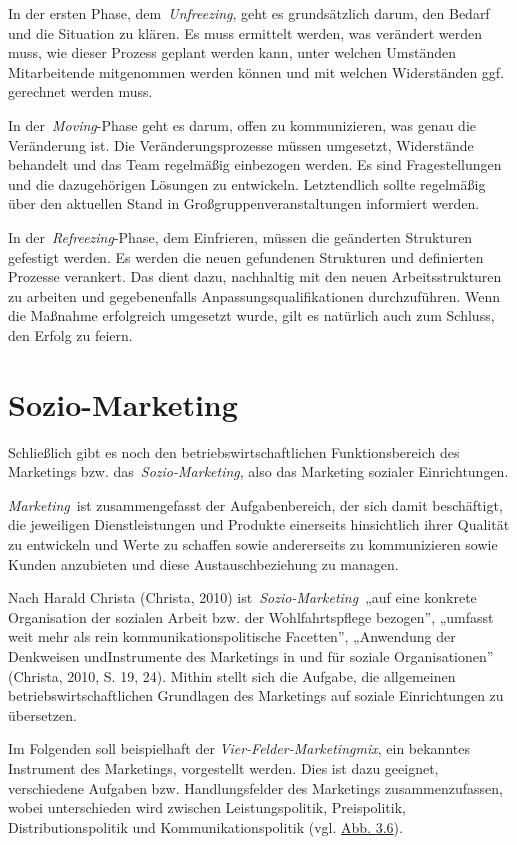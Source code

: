 \documentclass[
  letterpaper,
]{book}
\begin{document}
In der ersten Phase, dem~\emph{Unfreezing}, geht es grundsätzlich darum,
den Bedarf und die Situation zu klären. Es muss ermittelt werden, was
verändert werden muss, wie dieser Prozess geplant werden kann, unter
welchen Umständen Mitarbeitende mitgenommen werden können und mit
welchen Widerständen ggf. gerechnet werden muss.

In der~\emph{Moving}-Phase geht es darum, offen zu kommunizieren, was
genau die Veränderung ist. Die Veränderungsprozesse müssen umgesetzt,
Widerstände behandelt und das Team regelmäßig einbezogen werden. Es sind
Fragestellungen und die dazugehörigen Lösungen zu entwickeln.
Letztendlich sollte regelmäßig über den aktuellen Stand in
Großgruppenveranstaltungen informiert werden.

In der~\emph{Refreezing}-Phase, dem Einfrieren, müssen die geänderten
Strukturen gefestigt werden. Es werden die neuen gefundenen Strukturen
und definierten Prozesse verankert. Das dient dazu, nachhaltig mit den
neuen Arbeitsstrukturen zu arbeiten und gegebenenfalls
Anpassungsqualifikationen durchzuführen. Wenn die Maßnahme erfolgreich
umgesetzt wurde, gilt es natürlich auch zum Schluss, den Erfolg zu
feiern.

\section{Sozio-Marketing}\label{sozio-marketing}

Schließlich gibt es noch den betriebswirtschaftlichen Funktionsbereich
des Marketings bzw. das~\emph{Sozio-Marketing}, also das Marketing
sozialer Einrichtungen.

\emph{Marketing}~ist zusammengefasst der Aufgabenbereich, der sich damit
beschäftigt, die jeweiligen Dienstleistungen und Produkte einerseits
hinsichtlich ihrer Qualität zu entwickeln und Werte zu schaffen sowie
andererseits zu kommunizieren sowie Kunden anzubieten und diese
Austauschbeziehung zu managen.

Nach Harald Christa (Christa, 2010) ist~\emph{Sozio-Marketing}~„auf eine
konkrete Organisation der sozialen Arbeit bzw. der Wohlfahrtspflege
bezogen'', „umfasst weit mehr als rein kommunikationspolitische
Facetten'', „Anwendung der Denkweisen undInstrumente des Marketings in
und für soziale Organisationen'' (Christa, 2010, S. 19, 24). Mithin
stellt sich die Aufgabe, die allgemeinen betriebswirtschaftlichen
Grundlagen des Marketings auf soziale Einrichtungen zu übersetzen.

Im Folgenden soll beispielhaft der \emph{Vier-Felder-Marketingmix}, ein
bekanntes Instrument des Marketings, vorgestellt werden. Dies ist dazu
geeignet, verschiedene Aufgaben bzw. Handlungsfelder des Marketings
zusammenzufassen, wobei unterschieden wird zwischen Leistungspolitik,
Preispolitik, Distributionspolitik und Kommunikationspolitik (vgl.
\hyperref[figure36]{Abb. 3.6}).
\end{document}
